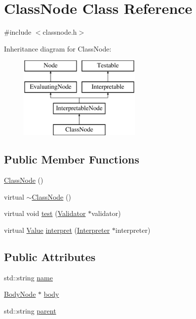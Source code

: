 \hypertarget{classClassNode}{}\section{Class\+Node Class Reference}
\label{classClassNode}


{\ttfamily \#include $<$classnode.\+h$>$}

Inheritance diagram for Class\+Node\+:\begin{figure}[H]
\begin{center}
\leavevmode
\includegraphics[height=4.000000cm]{classClassNode}
\end{center}
\end{figure}
\subsection*{Public Member Functions}
\begin{DoxyCompactItemize}
\item 
\hyperlink{classClassNode_a217389d155a37b90d12fa6a9d49d6326}{Class\+Node} ()
\item 
virtual \hyperlink{classClassNode_a3c0d617d08db3d2f0e9ade88f30bb04d}{$\sim$\+Class\+Node} ()
\item 
virtual void \hyperlink{classClassNode_ac5147024d81a0c6841e9453025e4f988}{test} (\hyperlink{classValidator}{Validator} $\ast$validator)
\item 
virtual \hyperlink{classValue}{Value} \hyperlink{classClassNode_a7515421face64d74e99e180fb297684b}{interpret} (\hyperlink{classInterpreter}{Interpreter} $\ast$interpreter)
\end{DoxyCompactItemize}
\subsection*{Public Attributes}
\begin{DoxyCompactItemize}
\item 
std\+::string \hyperlink{classClassNode_a1fc3152f6442b5f6913ec72f26afacbe}{name}
\item 
\hyperlink{classBodyNode}{Body\+Node} $\ast$ \hyperlink{classClassNode_ad5c089e050c2c7da583376fe16762689}{body}
\item 
std\+::string \hyperlink{classClassNode_a844a82eec88057b0faaf203f5a60a301}{parent}
\end{DoxyCompactItemize}
